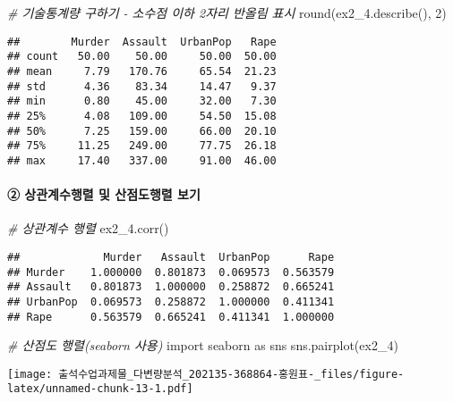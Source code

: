 \documentclass[
]{article}
\newenvironment{Shaded}{\begin{snugshade}}{\end{snugshade}}
\newcommand{\BuiltInTok}[1]{#1}
\newcommand{\CommentTok}[1]{\textcolor[rgb]{0.56,0.35,0.01}{\textit{#1}}}
\newcommand{\DecValTok}[1]{\textcolor[rgb]{0.00,0.00,0.81}{#1}}
\newcommand{\ImportTok}[1]{#1}
\newcommand{\NormalTok}[1]{#1}
\begin{document}
\begin{Shaded}
\begin{Highlighting}[]
\CommentTok{\# 기술통계량 구하기 {-} 소수점 이하 2자리 반올림 표시}
\BuiltInTok{round}\NormalTok{(ex2\_4.describe(), }\DecValTok{2}\NormalTok{)}
\end{Highlighting}
\end{Shaded}

\begin{verbatim}
##        Murder  Assault  UrbanPop   Rape
## count   50.00    50.00     50.00  50.00
## mean     7.79   170.76     65.54  21.23
## std      4.36    83.34     14.47   9.37
## min      0.80    45.00     32.00   7.30
## 25%      4.08   109.00     54.50  15.08
## 50%      7.25   159.00     66.00  20.10
## 75%     11.25   249.00     77.75  26.18
## max     17.40   337.00     91.00  46.00
\end{verbatim}

\hypertarget{uxc0c1uxad00uxacc4uxc218uxd589uxb82c-uxbc0f-uxc0b0uxc810uxb3c4uxd589uxb82c-uxbcf4uxae30}{%
\paragraph{② 상관계수행렬 및 산점도행렬
보기}\label{uxc0c1uxad00uxacc4uxc218uxd589uxb82c-uxbc0f-uxc0b0uxc810uxb3c4uxd589uxb82c-uxbcf4uxae30}}

\begin{Shaded}
\begin{Highlighting}[]
\CommentTok{\# 상관계수 행렬}
\NormalTok{ex2\_4.corr()}
\end{Highlighting}
\end{Shaded}

\begin{verbatim}
##             Murder   Assault  UrbanPop      Rape
## Murder    1.000000  0.801873  0.069573  0.563579
## Assault   0.801873  1.000000  0.258872  0.665241
## UrbanPop  0.069573  0.258872  1.000000  0.411341
## Rape      0.563579  0.665241  0.411341  1.000000
\end{verbatim}

\begin{Shaded}
\begin{Highlighting}[]
\CommentTok{\# 산점도 행렬(seaborn 사용)}
\ImportTok{import}\NormalTok{ seaborn }\ImportTok{as}\NormalTok{ sns}
\NormalTok{sns.pairplot(ex2\_4)}
\end{Highlighting}
\end{Shaded}

\texttt{[image: 출석수업과제물\_다변량분석\_202135-368864-홍원표-\_files/figure-latex/unnamed-chunk-13-1.pdf]}
\end{document}
